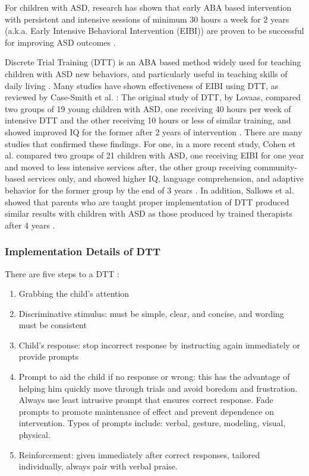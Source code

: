 For children with ASD, research has shown that early ABA based intervention with persistent and intensive sessions of minimum 30 hours a week for 2 years (a.k.a. Early Intensive Behavioral Intervention (EIBI)) are proven to be successful for improving ASD outcomes \cite{howlin2009systematic}.

Discrete Trial Training (DTT) is an ABA based method widely used for teaching children with ASD new behaviors, and particularly useful in teaching skills of daily living \cite{smith2001discrete}.  Many studies have shown effectiveness of EIBI using DTT, as reviewed by Case-Smith et al. \cite{case2008evidence}: The original study of DTT, by Lovaas, compared two groups of 19 young children with ASD, one receiving 40 hours per week of intensive DTT and the other receiving 10 hours or less of similar training, and showed improved IQ for the former after 2 years of intervention \cite{lovaas1987behavioral}.  There are many studies that confirmed these findings.  For one, in a more recent study, Cohen et al. compared two groups of 21 children with ASD, one receiving EIBI for one year and moved to less intensive services after, the other group receiving community-based services only, and showed higher IQ, language comprehension, and adaptive behavior for the former group by the end of 3 years \cite{cohen2006early}.  In addition, Sallows et al. showed that parents who are taught proper implementation of DTT produced similar results with children with ASD as those produced by trained therapists after 4 years \cite{sallows2005intensive}.

\subsubsection{Implementation Details of DTT}
There are five steps to a DTT \cite{bogin2010steps}:
\begin{enumerate}
	\item Grabbing the child's attention
	\item Discriminative stimulus: must be simple, clear, and concise, and wording must be consistent
	\item Child's response: stop incorrect response by instructing again immediately or provide prompts
	\item Prompt to aid the child if no response or wrong: this has the advantage of helping him quickly move through trials and avoid boredom and frustration.  Always use least intrusive prompt that ensures correct response.  Fade prompts to promote maintenance of effect and prevent dependence on intervention.  Types of prompts include: verbal, gesture, modeling, visual, physical.
	\item Reinforcement: given immediately after correct responses, tailored individually, always pair with verbal praise.
\end{enumerate}

